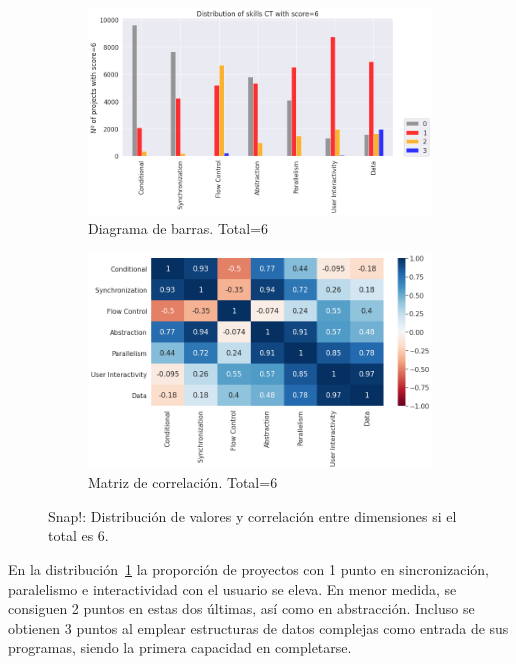 \documentclass[a4paper, 12pt]{book}
\begin{document}
\begin{figure}[H]
    \centering
    \begin{subfigure}[h]{.49\textwidth} 
        \includegraphics[width=\textwidth]{img/distribucion_6_Snap}
        \caption{Diagrama de barras. Total=6}
        \label{fig:total6_Snap}
    \end{subfigure}       
    \begin{subfigure}[h]{.49\textwidth} 
        \includegraphics[width=\textwidth]{img/corr_6_Snap}
        \caption{Matriz de correlación. Total=6}
        \label{fig:corr6_Snap}
    \end{subfigure}
    \caption{Snap!: Distribución de valores y correlación entre dimensiones si el total es 6.}
\end{figure}

En la distribución~\ref{fig:total6_Snap} la proporción de proyectos con 1 punto en sincronización, paralelismo e interactividad con el usuario se eleva. En menor medida, se consiguen 2 puntos en estas dos últimas, así como en abstracción. Incluso se obtienen 3 puntos al emplear estructuras de datos complejas como entrada de sus programas, siendo la primera capacidad en completarse.
\end{document}
